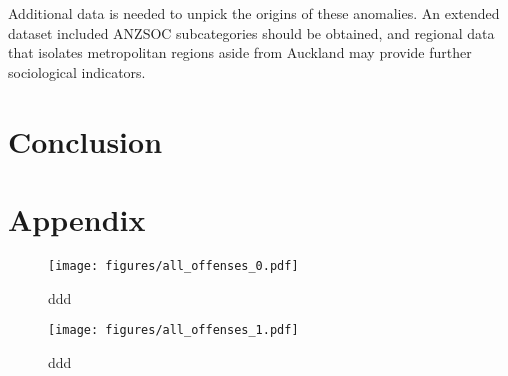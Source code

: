 \documentclass[onecolumn]{mysimple}
\begin{document}
Additional data is needed to unpick the origins of these anomalies.
An extended dataset included ANZSOC subcategories should be obtained, and regional data that isolates metropolitan regions aside from Auckland may provide further sociological indicators.



\section*{Conclusion}

\section*{Appendix}

\begin{figure}
  \centering
  \caption{ddd}
  \texttt{[image: figures/all\_offenses\_0.pdf]}
\end{figure}

\begin{figure}
  \centering
  \caption{ddd}
  \texttt{[image: figures/all\_offenses\_1.pdf]}
\end{figure}
\end{document}

